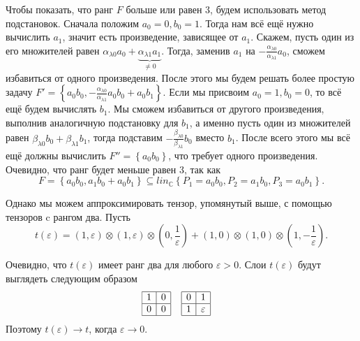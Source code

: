 Чтобы показать, что ранг $F$ больше или равен 3, будем использовать метод подстановок. Сначала положим $a_0=0, b_0=1$. Тогда нам всё ещё нужно вычислить $a_1$, значит есть произведение, зависящее от $a_1$. Скажем, пусть один из его множителей равен $\alpha_{\lambda 0} a_0 + \underbrace{\alpha_{\lambda 1} a_1}_{\neq 0}$. Тогда, заменив $a_1$ на $- \frac{\alpha_{\lambda 0}}{\alpha_{\lambda 1}} a_0$, сможем избавиться от одного произведения. После этого мы будем решать более простую задачу $F' = \left\{ a_0 b_0, -\frac{\alpha_{\lambda 0}}{\alpha_{\lambda 1}}a_0 b_0 + a_0 b_1 \right\}$. Если мы присвоим $a_0=1, b_0=0$, то всё ещё будем вычислять $b_1$. Мы сможем избавиться от другого произведения, выполнив аналогичную подстановку для $b_1$, а именно пусть один из множителей равен $\beta_{\lambda 0} b_0 + \beta_{\lambda 1} b_1$, тогда подставим $-\frac{\beta_{\lambda 0}}{\beta_{\lambda 1}} b_0$ вместо $b_1$.  После всего этого мы всё ещё должны вычислить $F'' = \left\{ a_0 b_0  \right\} $, что требует одного произведения. Очевидно, что ранг будет меньше равен 3, так как 
\[
	F  = \left\{ a_0 b_0, a_1 b_0 + a_0 b_1 \right\} \subseteq lin_{\mathbb{C}}\left\{ P_1 = a_0 b_0, P_2 = a_1 b_0, P_3 = a_0 b_1 \right\}.
\] 

\label{border_rank_2}
Однако мы можем аппроксимировать тензор, упомянутый выше, с помощью тензоров c рангом два. Пусть
\[
	t(\varepsilon)=(1,\varepsilon) \otimes (1,\varepsilon) \otimes (0, \frac{1}{\varepsilon}) + (1,0) \otimes (1,0) \otimes (1, -\frac{1}{\varepsilon}).
\]

Очевидно, что $t(\varepsilon)$ имеет ранг два для любого $\varepsilon > 0$. Слои $t(\varepsilon)$ будут выглядеть следующим образом
\begin{align*}
  \begin{array}{|c|c|}
  \hline
  1 & 0 \\
  \hline
  0 & 0\\
  \hline
 \end{array}  & \;\;\;\;
 \begin{array}{|c|c|}
  \hline
  0 & 1 \\
  \hline
  1 & \varepsilon\\
  \hline
 \end{array} 
\end{align*}
Поэтому $t(\varepsilon) \to t$, когда $\varepsilon \to 0$.

